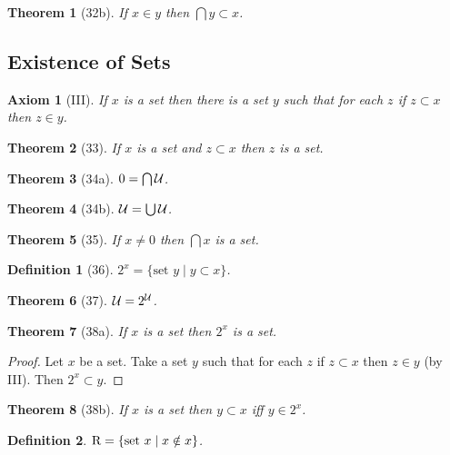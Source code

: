\documentclass{scrartcl}
\newtheorem*{axiom}{Axiom}
\newtheorem*{theorem}{Theorem}
\newtheorem*{definition}{Definition}
\begin{document}
\begin{theorem}[32b] If $x \in y$ then $\bigcap y \subset x$.
\end{theorem}


\subsection{Existence of Sets}


\begin{axiom}[III] If $x$ is a set then there is a set $y$ such that for each
$z$ if $z \subset x$ then $z \in y$.
\end{axiom}

\begin{theorem}[33] If $x$ is a set and $z \subset x$ then $z$ is a set.
\end{theorem}

\begin{theorem}[34a] $0 = \bigcap {\cal U}$.
\end{theorem}

\begin{theorem}[34b] ${\cal U} = \bigcup {\cal U}$.
\end{theorem}

\begin{theorem}[35] If $x \neq 0$ then $\bigcap x$ is a set.
\end{theorem}


\begin{definition}[36] $2^{x} = \{\text{set } y \mid y \subset x\}$.
\end{definition}

\begin{theorem}[37] ${\cal U} = 2^{{\cal U}}$.
\end{theorem}

\begin{theorem}[38a] If $x$ is a set then $2^{x}$ is a set.
\end{theorem}
\begin{proof} Let $x$ be a set.
Take a set $y$ such that for each $z$ 
if $z \subset x$ then $z \in y$ (by III).
Then $2^{x} \subset y$.
\end{proof}

\begin{theorem}[38b] If $x$ is a set then $y \subset x$ iff $y \in 2^{x}$.
\end{theorem}

\begin{definition} ${\rm R} = \{\text{set } x \mid x \notin x\}$.
\end{definition}
\end{document}
